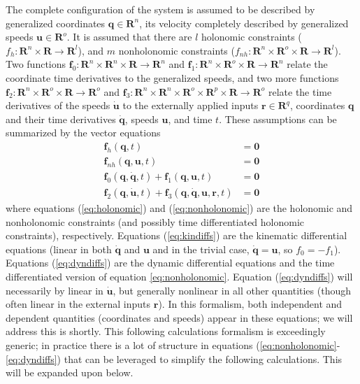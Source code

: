 \documentclass{svjour3}                     %
\begin{document}
The complete configuration of the system is assumed to be described by
generalized coordinates $\bm{q}\in\bm{R}^n$, its velocity completely described
by generalized speeds $\bm{u}\in\bm{R}^o$.  It is assumed that there are $l$
holonomic constraints ($f_h : \mathbf{R}^n \times \mathbf{R} \to
\mathbf{R}^l$), and $m$ nonholonomic constraints ($f_{nh} : \mathbf{R}^n \times
\mathbf{R}^o \times \mathbf{R} \to \mathbf{R}^l$). Two functions $\bm{f}_0 :
\mathbf{R}^n \times \mathbf{R}^n \times \mathbf{R} \to \mathbf{R}^n$ and
$\bm{f}_1 : \mathbf{R}^n \times \mathbf{R}^o \times \mathbf{R} \to
\mathbf{R}^n$ relate the coordinate time derivatives to the generalized speeds,
and two more functions $\bm{f}_2 : \mathbf{R}^n \times \mathbf{R}^o \times
\mathbf{R} \to \mathbf{R}^o$ and $\bm{f}_3 : \mathbf{R}^n
\times \mathbf{R}^n \times \mathbf{R}^o \times \mathbf{R}^p \times \mathbf{R}
\to \mathbf{R}^o$ relate the time derivatives of the speeds $\bm{\dot{u}}$ to
the externally applied inputs $\bm{r}\in\bm{R}^q$, coordinates $\bm{q}$ and
their time derivatives $\bm{\dot{q}}$,  speeds $\bm{u}$, and time $t$. These
assumptions can be summarized by the vector equations
\begin{align}
  \label{eq:holonomic}
  \bm{f}_{h}(\bm{q}, t) &= \bm{0}\\
  \label{eq:nonholonomic}
  \bm{f}_{nh}(\bm{q}, \bm{u}, t) &= \bm{0}\\
  \label{eq:kindiffs}
  \bm{f}_{0}(\bm{q}, \bm{\dot{q}}, t)
    + \bm{f}_{1}(\bm{q}, \bm{u}, t) &= \bm{0} \\
  \label{eq:dyndiffs}
  \bm{f}_{2}(\bm{q}, \bm{\dot{u}}, t)
    + \bm{f}_{3}(\bm{q}, \bm{\dot{q}}, \bm{u}, \bm{r}, t) & = \bm{0}
\end{align}
where equations (\ref{eq:holonomic}) and (\ref{eq:nonholonomic}) are the
holonomic and nonholonomic constraints (and possibly time differentiated holonomic
constraints), respectively. Equations (\ref{eq:kindiffs}) are the kinematic differential equations
(linear in both $\bm{\dot{q}}$ and $\bm{u}$ and in the trivial case,
$\bm{\dot{q}} = \bm{u}$, so $f_0 = -f_1$).  Equations (\ref{eq:dyndiffs}) are
the dynamic differential equations
and the time differentiated version of equation \ref{eq:nonholonomic}.
Equation (\ref{eq:dyndiffs}) will necessarily by linear in $\bm{\dot{u}}$, but
generally nonlinear in all other quantities (though often linear in the
external inputs $\bm{r}$).  In this formalism, both independent and dependent
quantities (coordinates and speeds) appear in these equations; we will address
this is shortly.  This following calculations formalism is exceedingly generic;
in practice there is a lot of structure in equations
(\ref{eq:nonholonomic}-\ref{eq:dyndiffs}) that can be leveraged to simplify the
following calculations.  This will be expanded upon below.
\end{document}
